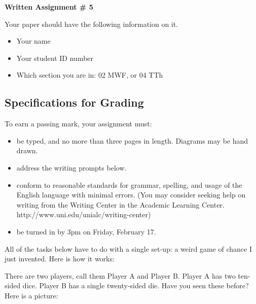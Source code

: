 \documentclass[12pt,letterpaper]{article}
\theoremstyle{definition}
\begin{document}
\setlength{\parskip}{1ex plus 0.5ex minus 0.2ex}
\setlength{\parindent}{0pt}

\pagestyle{fancy}
\lfoot{}
\rfoot{}

\begin{center}
{
\Large
\textbf{Written Assignment \# 5}
}
\end{center}

Your paper should have the following information on it.
\begin{itemize}
\item Your name
\item Your student ID number 
\item Which section you are in: 02 MWF, or 04 TTh
\end{itemize}


\subsection*{Specifications for Grading}

To earn a passing mark, your assignment must:
\begin{itemize}
\item be typed, and no more than three pages in length. Diagrams may be hand drawn.
\item address the writing prompts below.
\item conform to reasonable standards for grammar, spelling, and usage of the English language with minimal errors. (You may consider seeking help on writing from the Writing Center in the Academic Learning Center. http://www.uni.edu/unialc/writing-center)
\item be turned in by 3pm on Friday, February 17.
\end{itemize}


All of the tasks below have to do with a single set-up: a weird game of chance I just invented. Here is how it works:

There are two players, call them Player A and Player B. Player A has two ten-sided dice. Player B has a single twenty-sided die. Have you seen these before? Here is a picture:
\end{document}
